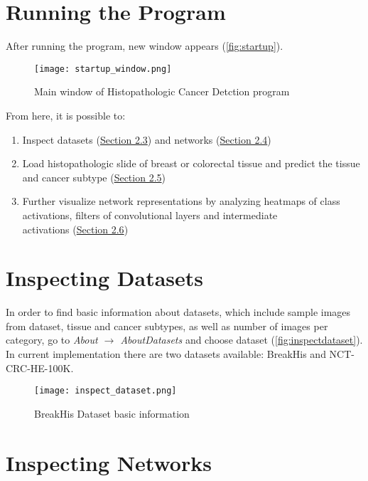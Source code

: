 \section{Running the Program}

After running the program, new window appears (\textcolor{red}{\autoref{fig:startup}}).

\begin{figure}[h]
	\centering
	\texttt{[image: startup\_window.png]}
	\caption{Main window of Histopathologic Cancer Detction program}
	\label{fig:startup}
\end{figure}

From here, it is possible to:
\begin{enumerate}
	\itemsep 0em
	\item Inspect datasets (\textcolor{red}{\hyperref[inspdata]{Section 2.3}}) and networks (\textcolor{red}{\hyperref[inspnets]{Section 2.4}})
	\item Load histopathologic slide of breast or colorectal tissue and predict the tissue and cancer subtype (\textcolor{red}{\hyperref[basicuse]{Section 2.5}})
	\item Further visualize network representations by analyzing heatmaps of class activations, filters of convolutional layers and intermediate \\ activations (\textcolor{red}{\hyperref[advuse]{Section 2.6}})
\end{enumerate}
\clearpage

\section{Inspecting Datasets}
\label{inspdata}

In order to find basic information about datasets, which include sample images from dataset, tissue and cancer subtypes, as well as number of images per category, go to \emph{About $\rightarrow$ About\;Datasets} and choose dataset (\textcolor{red}{\autoref{fig:inspectdataset}}). In current implementation there are two datasets available: BreakHis and NCT-CRC-HE-100K.

\begin{figure}[h]
	\centering
	\texttt{[image: inspect\_dataset.png]}
	\caption{BreakHis Dataset basic information}
	\label{fig:inspectdataset}
\end{figure}

\section{Inspecting Networks}
\label{inspnets}

